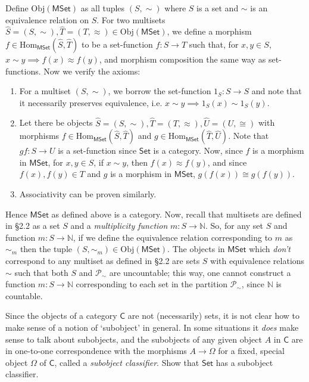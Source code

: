 \documentclass[12pt,letterpaper,boxed]{hmcpset}
\newcommand{\Obj}{\mathrm{Obj}}
\newcommand{\Hom}{\mathrm{Hom}}
\newcommand{\Set}{\mathsf{Set}}
\begin{document}
\begin{solution}
	Define $\Obj(\mathsf{MSet})$ as all tuples $(S, \sim)$ where $S$ is a set and $\sim$ is
	an equivalence relation on $S$. For two multisets $\hat{S} = (S,\sim), \hat{T} =
	(T,\approx) \in \Obj(\mathsf{MSet})$, we define a morphism
	$f\in\Hom_{\mathsf{MSet}}(\hat{S},\hat{T})$ to be a set-function $f:S\to T$ such that, for
	$x,y\in S$, $x\sim y\implies f(x)\approx f(y)$, and morphism composition the
	same way as set-functions. Now we verify the axioms:
	
	\begin{enumerate}
		\item For a multiset $(S,\sim)$, we borrow the set-function $1_S:S\to S$ and
		note that it necessarily preserves equivalence, i.e. $x\sim y\implies 1_S(x)\sim
		1_S(y)$.
		\item Let there be objects $\hat{S}=(S,\sim), \hat{T}=(T,\approx),
		\hat{U}=(U,\cong)$ with morphisms $f\in\Hom_{\mathsf{MSet}}(\hat{S},\hat{T})$ and
		$g\in\Hom_{\mathsf{MSet}}(\hat{T},\hat{U})$. Note that $gf:S\to U$ is a set-function since
		$\Set$ is a category. Now, since $f$ is a morphism in ${\mathsf{MSet}}$, for
		$x,y\in S$, if $x\sim y$, then $f(x)\approx f(y)$, and since $f(x),f(y)\in T$
		and $g$ is a morphism in ${\mathsf{MSet}}$, $g(f(x))\cong g(f(y))$.
		\item Associativity can be proven similarly.
	\end{enumerate}
	
	Hence ${\mathsf{MSet}}$ as defined above is a category. Now, recall that multisets are
	defined in \S2.2 as a set $S$ and a \textit{multiplicity function}
	$m:S\to\mathbb{N}$. So, for any set $S$ and function $m:S\to\mathbb{N}$, if we
	define the equivalence relation corresponding to $m$ as $\sim_m$ then the
	tuple $(S,\sim_m)\in\Obj({\mathsf{MSet}})$. The objects in ${\mathsf{MSet}}$ which
	\textit{don't} correspond to any multiset as defined in \S2.2 are sets $S$ with
	equivalence relations $\sim$ such that both $S$ and $\mathscr{P}_\sim$ are
	uncountable; this way, one cannot construct a function $m:S\to\mathbb{N}$
	corresponding to each set in the partition $\mathscr{P}_\sim$, since
	$\mathbb{N}$ is countable.
\end{solution}


\begin{problem}[3.10]
	Since the objects of a category $\mathsf{C}$ are not (necessarily) sets, it is not clear
	how to make sense of a notion of `subobject' in general. In some situations it
	\textit{does} make sense to talk about subobjects, and the subobjects of any
	given object $A$ in $\mathsf{C}$ are in one-to-one correspondence with the morphisms
	$A\to\Omega$ for a fixed, special object $\Omega$ of $\mathsf{C}$, called a
	\textit{subobject classifier}. Show that $\Set$ has a subobject classifier.
\end{problem}
\end{document}
